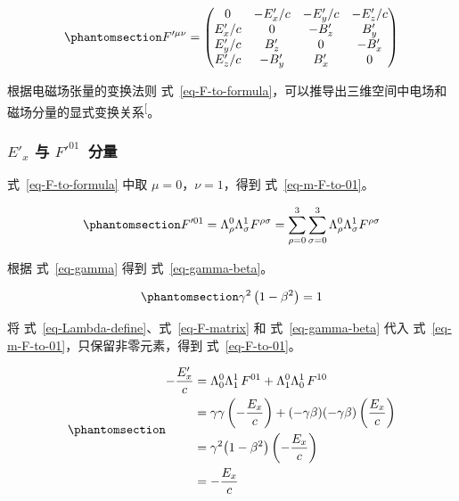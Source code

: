 \documentclass[
  chinese,
  a4paper,
  UTF8,
  12pt,
  oneside,
  openany]{ctexbook}
\theoremstyle{plain}
\theoremstyle{plain}
\theoremstyle{plain}
\theoremstyle{definition}
\theoremstyle{plain}
\theoremstyle{plain}
\theoremstyle{remark}
\begin{document}
\begin{equation}\protect\phantomsection\label{eq-F-mat-to-mu-nu}{
F'^{\mu\nu} = \begin{pmatrix}
 0 & - E'_x/c & - E'_y/c & - E'_z/c \\
 E'_x/c & 0 & - B'_z & B'_y \\
 E'_y/c & B'_z & 0 & -B'_{x} \\
 E'_z/c & - B'_y & B'_x & 0
 \end{pmatrix}
}\end{equation}

根据电磁场张量的变换法则
式~\ref{eq-F-to-formula}，可以推导出三维空间中电场和磁场分量的显式变换关系\textsuperscript{{[}\citeproc{ref-griffiths2025}{7}{]}}。

\subsubsection{\texorpdfstring{\(E'_x\) 与
\(F'^{01}\)~分量}{E\textquotesingle\_x 与 F\textquotesingle\^{}\{01\}~分量}}\label{e_x-ux4e0e-f01-ux5206ux91cf}

式~\ref{eq-F-to-formula} 中取 \(\mu = 0\)，\(\nu = 1\)，得到
式~\ref{eq-m-F-to-01}。

\begin{equation}\protect\phantomsection\label{eq-m-F-to-01}{
F'^{01} = \Lambda_{\rho}^{0}\Lambda_{\sigma}^{1}F^{\rho\sigma}
= \sum_{\rho = 0}^{3}\sum_{\sigma = 0}^{3}\Lambda_{\rho}^{0}\Lambda_{\sigma}^{1}F^{\rho\sigma}
}\end{equation}

根据 式~\ref{eq-gamma} 得到 式~\ref{eq-gamma-beta}。

\begin{equation}\protect\phantomsection\label{eq-gamma-beta}{
\gamma^{2}\left(1 - \beta^{2} \right) = 1
}\end{equation}

将 式~\ref{eq-Lambda-define}、式~\ref{eq-F-matrix} 和
式~\ref{eq-gamma-beta} 代入 式~\ref{eq-m-F-to-01}，只保留非零元素，得到
式~\ref{eq-F-to-01}。

\begin{equation}\protect\phantomsection\label{eq-F-to-01}{
\begin{aligned}
-\frac{E'_x}{c}
&= \Lambda_{0}^{0}\Lambda_{1}^{1}\,F^{01}
+ \Lambda_{1}^{0}\Lambda_{0}^{1}\,F^{10} \\
&= \gamma\gamma\left(-\frac{E_x}{c}\right)
+ (-\gamma\beta)(-\gamma\beta)\left(\frac{E_x}{c}\right) \\
&= \gamma^{2}\bigl(1-\beta^{2}\bigr)\left(-\frac{E_x}{c}\right) \\
&= -\frac{E_x}{c}
\end{aligned}
}\end{equation}
\end{document}
